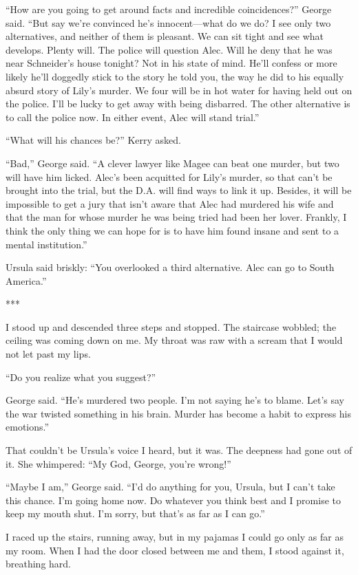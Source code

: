 {“How are you going to get around facts and incredible coincidences?” George said. “But say we’re convinced he’s innocent—what do we do? I see only two alternatives, and neither of them is pleasant. We can sit tight and see what develops. Plenty will. The police will question Alec. Will he deny that he was near Schneider’s house tonight? Not in his state of mind. He’ll confess or more likely he’ll doggedly stick to the story he told you, the way he did to his equally absurd story of Lily’s murder. We four will be in hot water for having held out on the police. I’ll be lucky to get away with being disbarred. The other alternative is to call the police now. In either event, Alec will stand trial.”

“What will his chances be?” Kerry asked.

“Bad,” George said. “A clever lawyer like Magee can beat one murder, but two will have him licked. Alec’s been acquitted for Lily’s murder, so that can’t be brought into the trial, but the D.A. will find ways to link it up. Besides, it will be impossible to get a jury that isn’t aware that Alec had murdered his wife and that the man for whose murder he was being tried had been her lover. Frankly, I think the only thing we can hope for is to have him found insane and sent to a mental institution.”

Ursula said briskly: “You overlooked a third alternative. Alec can go to South America.”

***

I stood up and descended three steps and stopped. The staircase wobbled; the ceiling was coming down on me. My throat was raw with a scream that I would not let past my lips.

“Do you realize what you suggest?”

George said. “He’s murdered two people. I’m not saying he’s to blame. Let’s say the war twisted something in his brain. Murder has become a habit to express his emotions.”

That couldn’t be Ursula’s voice I heard, but it was. The deepness had gone out of it. She whimpered: “My God, George, you’re wrong!”

“Maybe I am,” George said. “I’d do anything for you, Ursula, but I can’t take this chance. I’m going home now. Do whatever you think best and I promise to keep my mouth shut. I’m sorry, but that’s as far as I can go.”

I raced up the stairs, running away, but in my pajamas I could go only as far as my room. When I had the door closed between me and them, I stood against it, breathing hard.

}
